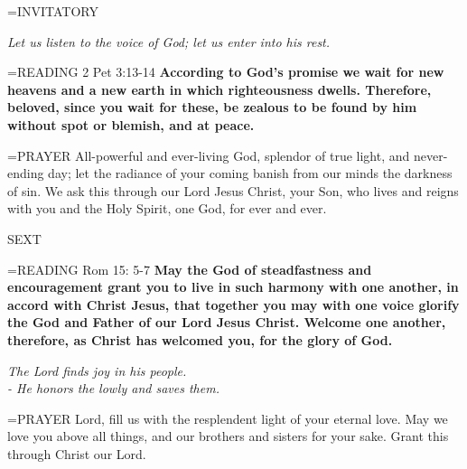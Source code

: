 \hangindent=\parindent \small{INVITATORY}
\begin{center}
\textit{Let us listen to the voice of God; let us enter into his rest.\\}
\end{center}

\hangindent=\parindent \small{READING} 2 Pet 3:13-14 \textbf{According to God’s promise we wait for new heavens and a new earth in which righteousness dwells. Therefore, beloved, since you wait for these, be zealous to be found by him without spot or blemish, and at peace.\\}

\hangindent=\parindent \small{PRAYER  All-powerful and ever-living God, splendor of true light, and never-ending day; let the radiance of your coming banish from our minds the darkness of sin. We ask this through our Lord Jesus Christ, your Son, who lives and reigns with you and the Holy Spirit, one God, for ever and ever.}

\begin{flushleft}\normalsize SEXT\\\end{flushleft}

\hangindent=\parindent \small{READING} Rom 15: 5-7 \textbf{May the God of steadfastness and encouragement grant you to live in such harmony with one another, in accord with Christ Jesus, that together you may with one voice glorify the God and Father of our Lord Jesus Christ. Welcome one another, therefore, as Christ has welcomed you, for the glory of God.  }

\begin{center}
\textit{The Lord finds joy in his people.\\
- He honors the lowly and saves them.}
\end{center}

\hangindent=\parindent \small{PRAYER  Lord, fill us with the resplendent light of your eternal love.  May we love you above all things, and our brothers and sisters for your sake. Grant this through Christ our Lord.}
